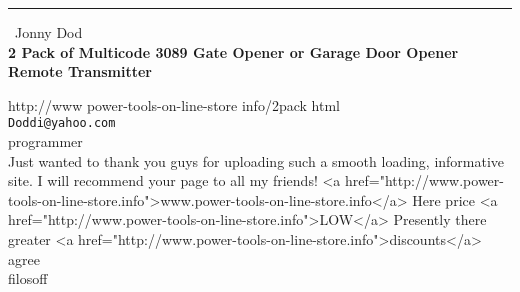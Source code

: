 \documentclass{report}
\begin{document}
\begin{center}
\rule{6in}{1pt} \
{\large Jonny Dod \\
{\bf 2 Pack of Multicode 3089 Gate Opener or Garage Door Opener Remote Transmitter}}

http://www power-tools-on-line-store info/2pack html
\\
{\tt Doddi@yahoo.com}\\
 programmer\\
Just wanted to thank you guys for uploading such a smooth loading, informative site. I will recommend your page to all my friends!
<a href="http://www.power-tools-on-line-store.info">www.power-tools-on-line-store.info</a>
Here price <a href="http://www.power-tools-on-line-store.info">LOW</a>
Presently there greater <a href="http://www.power-tools-on-line-store.info">discounts</a> agree\\
	filosoff\end{center}
\end{document}
